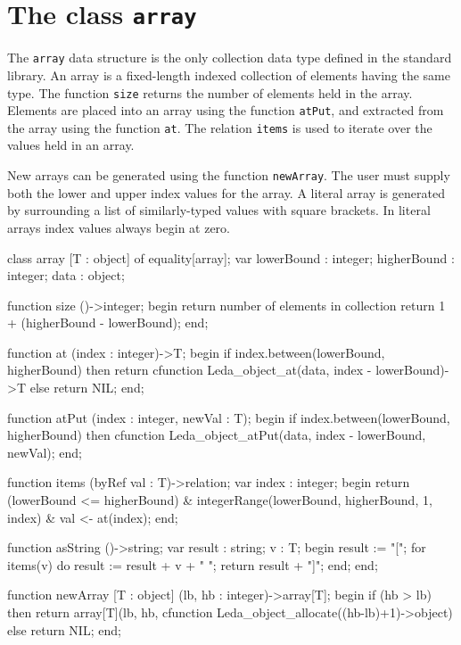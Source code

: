 \section{The class {\tt array}}

The {\tt array} data structure is the only collection data type defined
in the standard library.  An array is a fixed-length indexed
collection of elements having the same type.  The function {\tt size}
returns the number of elements held in the array.  Elements are
placed into an array using the function {\tt atPut}, and extracted
from the array using the function {\tt at}.  The relation {\tt items}
is used to iterate over the values held in an array.

New arrays can be generated using the function {\tt newArray}.
The user must supply both the lower and upper index values for the array.
A literal array is generated by surrounding a list of similarly-typed
values with square brackets.  In literal arrays index values
always begin at zero.

\begin{cprog}

class array [T : object] of equality[array];
var
	lowerBound : integer;
	higherBound : integer;
	data : object;

	function size ()->integer;
	begin		{ return number of elements in collection }
		return 1 + (higherBound - lowerBound);
	end;

	function at (index : integer)->T;
	begin
		if index.between(lowerBound, higherBound) then
			return cfunction
				Leda_object_at(data, index - lowerBound)->T
		else
			return NIL;
	end;

	function atPut (index : integer, newVal : T);
	begin
		if index.between(lowerBound, higherBound) then
			cfunction Leda_object_atPut(data, index - lowerBound, newVal);
	end;

	function items (byRef val : T)->relation;
	var
		index : integer;
	begin
		return (lowerBound <= higherBound) &
			integerRange(lowerBound, higherBound, 1, index) &
			val <- at(index);
	end;

	function asString ()->string;
	var
		result : string;
		v : T;
	begin
		result := "[";
		for items(v) do
			result := result + v + " ";
		return result + "]";
	end;
end;

function newArray [T : object] (lb, hb : integer)->array[T];
begin
	if (hb > lb) then
		return array[T](lb, hb,
			cfunction Leda_object_allocate((hb-lb)+1)->object)
	else
		return NIL;
end;

\end{cprog}


